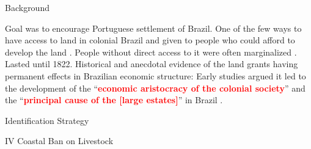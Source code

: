 \documentclass[aspectratio=1610]{beamer}
\begin{document}
\begin{frame}{Background}
    \begin{outline}
        \1 Goal was to encourage Portuguese settlement of Brazil.
        \vspace{2mm}
        \1 One of the few ways to have access to land in colonial Brazil and given to people who could afford to develop the land \parencites{Smith1944-oi}{Dean1971-iq}.
        \vspace{-1mm}
        \1 People without direct access to it were often marginalized \parencite{Simonsen2005-ps}.
        \vspace{2mm}
        \1 Lasted until 1822.
        \vspace{2mm}
        \1 Historical and anecdotal evidence of the land grants having permanent effects in Brazilian economic structure:
        \vspace{2mm}
            \2 Early studies argued it led to the development of the ``\textcolor{red}{\textbf{economic aristocracy of the colonial society}}'' and the ``\textcolor{red}{\textbf{principal cause of the [large estates]}}'' in Brazil \parencites[p.~36]{Lima1954-td}[p.~48]{Da_Costa_Porto1979-dz}. 
    \end{outline}    
\end{frame}



\begin{frame}{Identification Strategy}
    \begin{outline}
        \1 
        \1 IV
        \1 Coastal Ban on Livestock
    \end{outline}
\end{frame}
\end{document}
